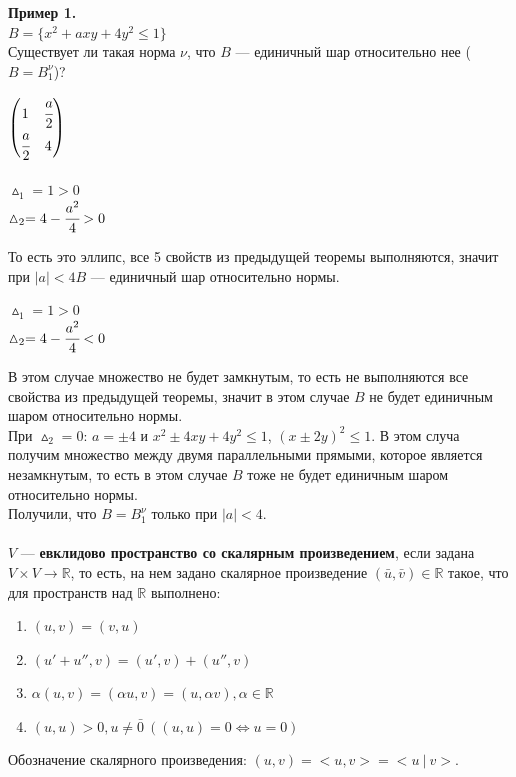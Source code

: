 \documentclass[12pt]{article}
\theoremstyle{definition}
\numberwithin{equation}{section}
\begin{document}
	\textbf{Пример 1.}\\
	$B = \{x^2+axy+4y^2 \leqslant 1\}$\\
	Существует ли такая норма $\nu$, что $B$ --- единичный шар относительно нее ($B = B_1^{\nu}$)?\\
	\begin{center}
		$
		\begin{pmatrix}
		1 & \cfrac{a}{2}\\
		\cfrac{a}{2} & 4
		\end{pmatrix}
		$
		\\ ~\\
		$\vartriangle_1 = 1 > 0$\\
		$\vartriangle_2 = 4 - \cfrac{a^2}{4} > 0$\end{center}
	То есть это эллипс, все 5 свойств из предыдущей теоремы выполняются, значит при $|a| < 4 B$ --- единичный шар относительно нормы.\begin{center}
		$\vartriangle_1 = 1 > 0$\\
		$\vartriangle_2 = 4 - \cfrac{a^2}{4} < 0$\end{center}
	В этом случае множество не будет замкнутым, то есть не выполняются все свойства из предыдущей теоремы, значит в этом случае $B$ не будет единичным шаром относительно нормы.\\
	При $\vartriangle_2 = 0$: $ a = \pm 4$ и $x^2 \pm 4xy+4y^2 \leqslant 1$, $(x \pm 2y)^2 \leqslant 1$. В этом случа получим множество между двумя параллельными прямыми, которое является незамкнутым, то есть в этом случае $B$ тоже не будет единичным шаром относительно нормы.\\
	Получили, что $B = B_1^{\nu}$ только при $|a| < 4$.\\
	\\
	$V$ --- \textbf{евклидово пространство со скалярным произведением}, если задана $V \times V \rightarrow \mathbb{R}$, то есть, на нем задано скалярное произведение $(\bar u, \bar v) \in \mathbb{R}$ такое, что для пространств над $\mathbb{R}$ выполнено:\begin{enumerate}
		\item $(u, v) = (v, u)$
		\item $(u'+u'', v) = (u', v)+(u'', v)$
		\item $\alpha (u, v) = (\alpha u, v) = (u, \alpha v), \alpha \in \mathbb{R}$
		\item $(u, u) > 0, u \neq \bar 0~ ((u, u) = 0 \Leftrightarrow u=0)$
	\end{enumerate}
	Обозначение скалярного произведения: $(u, v)=<u, v>=<u~|~v>$.\\ \\
\end{document}
